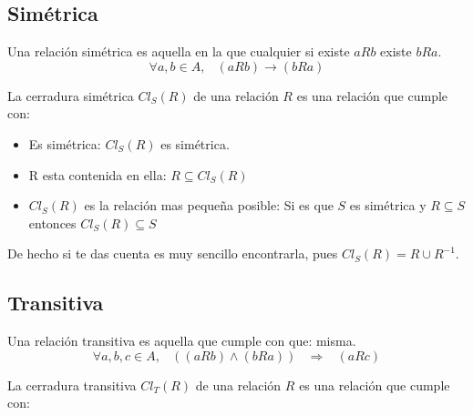 \documentclass[12pt, fleqn]{report}                             %
\DeclareMathOperator \Space     {\quad}                         %
\DeclareMathOperator \MiniSpace {\;}                            %
\theoremstyle{break}                                            %
\newcommand \lInfire {\MiniSpace \Rightarrow \MiniSpace}        %
\begin{document}
            \clearpage
            \subsection{Simétrica}

                Una relación simétrica es aquella en la que cualquier si existe $aRb$ existe $bRa$.
                \begin{equation*}
                    \forall a,b \in A,\MiniSpace (aRb) \to (bRa)
                \end{equation*}


                La cerradura simétrica $Cl_S(R)$ de una relación $R$ es una relación que cumple con:

                \begin{itemize}
                    \item Es simétrica: $Cl_S(R)$ es simétrica. 
                    \item R esta contenida en ella: $R \subseteq Cl_S(R)$
                    \item $Cl_S(R)$ es la relación mas pequeña posible: 
                    Si es que $S$ es simétrica y $R \subseteq S$ entonces $Cl_S(R) \subseteq S$
                \end{itemize}

                De hecho si te das cuenta es muy sencillo encontrarla, pues
                $Cl_S(R) = R \cup R^{-1}$.



            \clearpage
            \subsection{Transitiva}

                Una relación transitiva es aquella que cumple con que:
                misma.
                \begin{equation*}
                    \forall a,b,c \in A, \MiniSpace ((aRb) \land (bRa)) \lInfire (aRc)
                \end{equation*}

                La cerradura transitiva $Cl_T(R)$ de una relación $R$ es una relación que cumple con:
\end{document}
